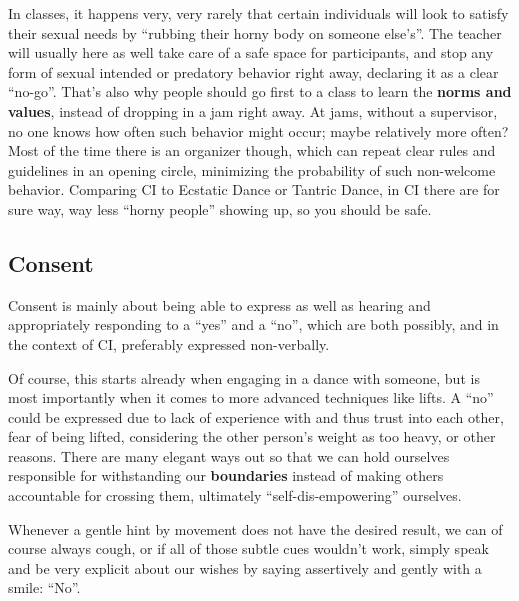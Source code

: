 In classes, it happens very, very rarely that certain individuals will look to satisfy their sexual needs by ``rubbing their horny body on someone else's''.
The teacher will usually here as well take care of a safe space for participants, and stop any form of sexual intended or predatory behavior right away, declaring it as a clear ``no-go''.
That's also why people should go first to a class to learn the \textbf{norms and values}, instead of dropping in a jam right away.
At jams, without a supervisor, no one knows how often such behavior might occur; maybe relatively more often?
Most of the time there is an organizer though, which can repeat clear rules and guidelines in an opening circle, minimizing the probability of such non-welcome behavior.
Comparing CI to Ecstatic Dance or Tantric Dance, in CI there are for sure way, way less ``horny people'' showing up, so you should be safe.

\subsection{Consent}\label{sec:consent}

Consent is mainly about being able to express as well as hearing and appropriately responding to a ``yes'' and a ``no'', which are both possibly, and in the context of CI, preferably expressed non-verbally.

Of course, this starts already when engaging in a dance with someone, but is most importantly when it comes to more advanced techniques like lifts.
A ``no'' could be expressed due to lack of experience with and thus trust into each other, fear of being lifted, considering the other person's weight as too heavy, or other reasons.
There are many elegant ways out so that we can hold ourselves responsible for withstanding our \textbf{boundaries} instead of making others accountable for crossing them, ultimately ``self-dis-empowering'' ourselves.

Whenever a gentle hint by movement does not have the desired result, we can of course always cough, or if all of those subtle cues wouldn't work, simply speak and be very explicit about our wishes by saying assertively and gently with a smile: ``No''.
